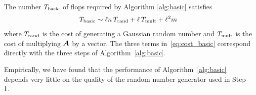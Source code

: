 \documentclass[final]{siamltex}
\begin{document}
\begin{figure}
\begin{center}
\end{center}
\end{figure}

The number $T_{\rm basic}$ of flops required by Algorithm \ref{alg:basic} satisfies
\begin{equation}
\label{eq:cost_basic}
T_{\rm basic} \sim \ell n \, T_{\rm rand} + \ell\,T_{\rm mult} + \ell^{2}m %
\end{equation}
where $T_{\rm rand}$ is the cost of generating a Gaussian random number
and $T_{\rm mult}$ is the cost of multiplying $\bm{A}$ by a vector.
The three terms in~\eqref{eq:cost_basic} correspond directly with the
three steps of Algorithm~\ref{alg:basic}.

Empirically, we have found that the performance of Algorithm~\ref{alg:basic}
depends very little on the quality of the random number generator used in Step 1.
\end{document}
